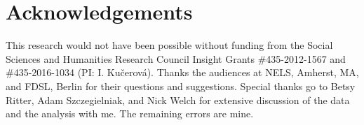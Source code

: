 \documentclass[output=paper,
modfonts
newtxmath,
hidelinks
]{langscibook}
\begin{document}
\section*{Acknowledgements}
This research would not have been possible without funding from the Social Sciences and Humanities Research Council Insight Grants \#435-2012-1567 and \#435-2016-1034  (PI: I. Kučerová). Thanks the audiences at NELS, Amherst, MA, and FDSL, Berlin for their questions and suggestions. Special thanks go to Betsy Ritter, Adam Szczegielniak, and Nick Welch for extensive discussion of the data and the analysis with me. The remaining errors are mine.

\sloppy
\printbibliography[heading=subbibliography,notkeyword=this]
\end{document}
